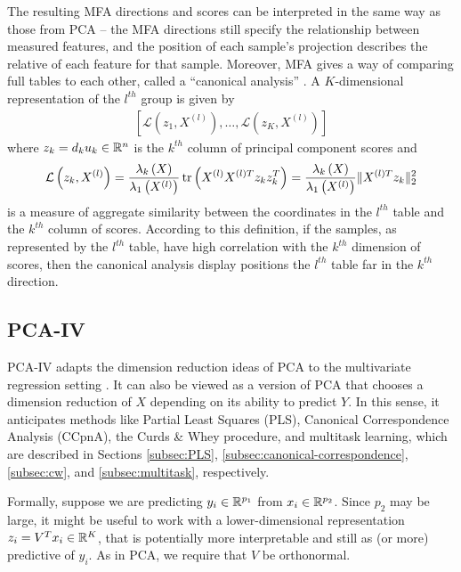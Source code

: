 \documentclass{article}
\begin{document}
The resulting MFA directions and scores can be interpreted in the same
way as those from PCA -- the MFA directions still specify the
relationship between measured features, and the position of each
sample's projection describes the relative  of each feature for
that sample. Moreover, MFA gives a way of comparing full tables to
each other, called a ``canonical analysis'' \citep{pages2004multiple}. A
$K$-dimensional representation of the $l^{th}$ group is given by
\begin{align*}
\left[\mathcal{L}\left(z_{1}, X^{(l)}\right), \dots,
  \mathcal{L}\left(z_{K}, X^{(l)}\right)\right]
\end{align*}
where $z_{k} = d_{k}u_{k} \in \mathbb{R}^{n}$ is the $k^{th}$ column of principal
component scores and
\begin{align*}
  \mathcal{L}\left(z_{k}, X^{(l)}\right) =
  \frac{\lambda_{k}\left(X\right)}{\lambda_{1}\left(X^{(l)}\right)}\mathop\mathrm{tr}\left(X^{(l)}X^{(l)
      T} z_{k}z_{k}^{T}\right) =
  \frac{\lambda_{k}\left(X\right)}{\lambda_{1}\left(X^{(l)}\right)}\|X^{(l)
  T} z_{k}\|^{2}_{2}
\end{align*}
is a measure of aggregate similarity between the coordinates in the $l^{th}$
table and the $k^{th}$ column of scores. According to this definition, if the
samples, as represented by the $l^{th}$ table, have high correlation with the
$k^{th}$ dimension of scores, then the canonical analysis display positions the
$l^{th}$ table far in the $k^{th}$ direction.

\subsection{PCA-IV}

PCA-IV adapts the dimension reduction ideas of PCA to the multivariate
regression setting \citep{rao1964use}. It can also be viewed as a version of PCA
that chooses a dimension reduction of $X$ depending on its ability to predict
$Y$. In this sense, it anticipates methods like Partial Least Squares (PLS),
Canonical Correspondence Analysis (CCpnA), the Curds \& Whey procedure, and
multitask learning, which are described in Sections \ref{subsec:PLS},
\ref{subsec:canonical-correspondence}, \ref{subsec:cw}, and
\ref{subsec:multitask}, respectively.

Formally, suppose we are predicting $y_{i} \in \mathbb{R}^{p_{1}}$ from $x_{i} \in
\mathbb{R}^{p_{2}}$. Since $p_{2}$ may be large, it might be useful to work with a
lower-dimensional representation $z_{i} = V^{T}x_{i} \in \mathbb{R}^{K}$, that is
potentially more interpretable and still as (or more) predictive of $y_{i}$. As
in PCA, we require that $V$ be orthonormal.
\end{document}
